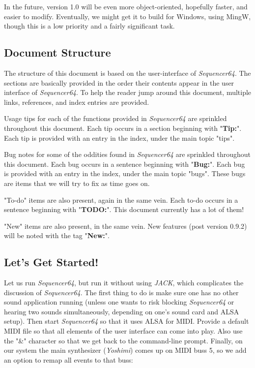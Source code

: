 \documentclass[
 11pt,
 twoside,
 a4paper,
 headinclude,
 footinclude,
 final                                 %
]{article}
\begin{document}
   In the future, version 1.0 will be even more object-oriented, hopefully
   faster, and easier to modify.  Eventually, we might get it to build
   for Windows, using MingW, though this is a low priority and a fairly
   significant task.

\subsection{Document Structure}
\label{subsec:introduction_document_structure}

   The structure of this document is based on the user-interface of
   \textsl{Sequencer64}.  The sections are basically provided in the order
   their contents appear in the user interface of \textsl{Sequencer64}.  To
   help the reader jump around this document, multiple links, references,
   and index entries are provided.

   Usage tips
   for each of the functions provided in
   \textsl{Sequencer64} are sprinkled throughout this document.
   Each tip occurs in a section beginning with "\textbf{Tip:}".
   Each tip is provided with an entry in the index, under the
   main topic "tips".

   Bug notes
   for some of the oddities found in \textsl{Sequencer64} are
   sprinkled throughout this document.
   Each bug occurs in a sentence beginning with "\textbf{Bug:}".
   Each bug is provided with an entry in the index, under the
   main topic "bugs".  These bugs are items that we will try to
   fix as time goes on.

   "To-do" items
   are also present, again in the same vein.
   Each to-do occurs in a sentence beginning with "\textbf{TODO:}".
   This document currently has a lot of them!

   "New" items
   are also present, in the same vein.
   New features (post version 0.9.2) will be noted with the tag
   "\textbf{New:}".

\subsection{Let's Get Started!}
\label{subsec:introduction_lets_get_started}

   Let us run \textsl{Sequencer64}, but run it without using \textsl{JACK},
   which complicates the discussion of \textsl{Sequencer64}.  The first
   thing to do is make sure one has no other sound application running
   (unless one wants to risk blocking \textsl{Sequencer64} or hearing two
    sounds simultaneously, depending on one's sound card and ALSA setup).
   Then start \textsl{Sequencer64} so that it uses ALSA for MIDI.  Provide a
   default MIDI file so that all elements of the user interface can come
   into play.  Also use the "\&" character so that we get back to the
   command-line prompt.  Finally, on our system the main synthesizer
   (\textsl{Yoshimi}) comes up on MIDI buss 5, so we add an option to remap
   all events to that buss:
\end{document}
